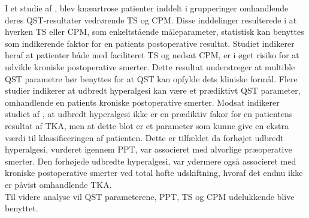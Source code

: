 I et studie af , blev knæartrose patienter inddelt i grupperinger omhandlende deres QST-resultater vedrørende TS og CPM. Disse inddelinger resulterede i at hverken TS eller CPM, som enkeltstående måleparameter, statistisk kan benyttes som indikerende faktor for en patients postoperative resultat. Studiet indikerer heraf at patienter både med faciliteret TS og nedsat CPM, er i øget risiko for at udvikle kroniske postoperative smerter. Dette resultat understreger at multible QST parametre bør benyttes for at QST kan opfylde dets kliniske formål. \citep{Petersen2016} Flere studier indikerer at udbredt hyperalgesi kan være et prædiktivt QST parameter, omhandlende en patients kroniske postoperative smerter. \citep{Petersen2016} \citep{Wylde2013} Modsat indikerer studiet af , at udbredt hyperalgesi ikke er en prædiktiv fakor for en patientens resultat af TKA, men at dette blot er et parameter som kunne give en ekstra værdi til klassificeringen af patienten. Dette er tilfældet da forhøjet udbredt hyperalgesi, vurderet igennem PPT, var associeret med alvorlige præoperative smerter. Den forhøjede udbredte hyperalgesi, var ydermere også associeret med kroniske postoperative smerter ved total hofte udskiftning, hvoraf det endnu ikke er påvist omhandlende TKA. \citep{Wylde2015} \\
Til videre analyse vil QST parameterene, PPT, TS og CPM udelukkende blive benyttet. 